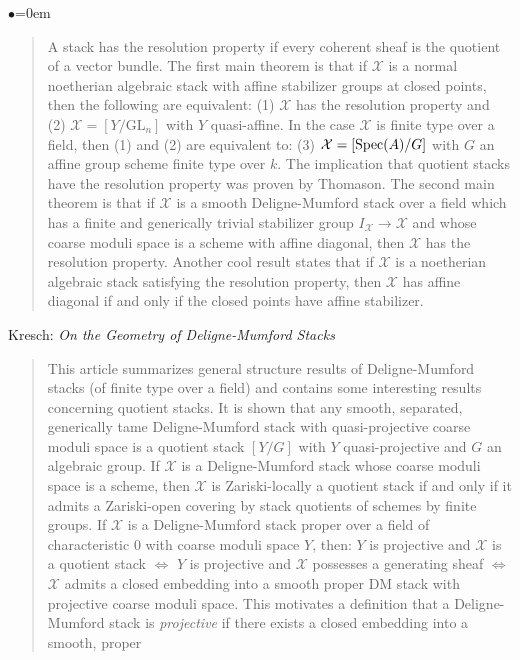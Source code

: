 \begin{list}{$\bullet$}{\leftmargin=0em}
\begin{quote}
A stack has the resolution property if every coherent sheaf is the quotient of 
a vector bundle. The first main theorem is that if $\mathcal{X}$ is a normal 
noetherian algebraic stack with affine stabilizer groups at closed points, then 
the following are equivalent: (1) $\mathcal{X}$ has the resolution property and 
(2) 
$\mathcal{X} = [Y/\text{GL}_n]$ with $Y$ quasi-affine. In the case 
$\mathcal{X}$ is finite type over 
a field, then (1) and (2) are equivalent to: (3)
$\mathcal{X} = [\mathop{\rm Spec}(A)/G]$ with $G$
an affine group scheme finite type over $k$. The implication that quotient 
stacks have the resolution property was proven by Thomason.
The second main theorem is that if $\mathcal{X}$ is a smooth Deligne-Mumford 
stack over 
a field which has a finite and generically trivial stabilizer group 
$I_{\mathcal{X}} 
\to \mathcal{X}$ and whose coarse moduli space is a scheme with affine 
diagonal, then 
$\mathcal{X}$ has the resolution property. Another cool result states that if 
$\mathcal{X}$ is 
a noetherian algebraic stack satisfying the resolution property, then 
$\mathcal{X}$ has 
affine diagonal if and only if the closed points have affine stabilizer. 
\end{quote}
\smallskip
\item Kresch: \emph{On the Geometry of Deligne-Mumford Stacks} 
\cite{kresch_geometry}
\begin{quote}
This article summarizes general structure results of Deligne-Mumford 
stacks (of finite type over a field) and contains some interesting results 
concerning quotient stacks. It is shown that any smooth, separated, 
generically tame Deligne-Mumford stack with quasi-projective coarse moduli 
space is a quotient stack $[Y/G]$ with $Y$ quasi-projective and $G$ an 
algebraic group. If $\mathcal{X}$ is a Deligne-Mumford stack whose coarse 
moduli space 
is a scheme, then $\mathcal{X}$ is Zariski-locally a quotient stack if and only 
if it 
admits a Zariski-open covering by stack quotients of schemes by finite groups.
If $\mathcal{X}$ is a Deligne-Mumford stack proper over a field of 
characteristic 0 
with coarse moduli space $Y$, then: $Y$ is projective and $\mathcal{X}$ is a 
quotient 
stack $\iff$ $Y$ is projective and $\mathcal{X}$ possesses a generating sheaf 
$\iff$ 
$\mathcal{X}$ admits a closed embedding into a smooth proper DM stack with 
projective 
coarse moduli space. This motivates a definition that a Deligne-Mumford stack 
is \emph{projective} if there exists a closed embedding into a smooth, proper 

\end{quote}
\end{list}
